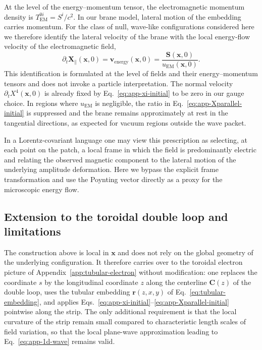 At the level of the energy--momentum tensor, the electromagnetic
momentum density is $T^{0i}_{\mathrm{EM}} = S^i/c^2$. In our brane
model, lateral motion of the embedding carries momentum. For the class
of null, wave-like configurations considered here we therefore identify
the lateral velocity of the brane with the local energy-flow velocity
of the electromagnetic field,
\begin{equation}
  \partial_t\mathbf X_\parallel(\mathbf x,0)
  = \mathbf v_{\mathrm{energy}}(\mathbf x,0)
  = \frac{\mathbf S(\mathbf x,0)}{u_{\mathrm{EM}}(\mathbf x,0)}.
  \label{eq:app-Xparallel-initial}
\end{equation}
This identification is formulated at the level of fields and their
energy--momentum tensors and does not invoke a particle interpretation.
The normal velocity $\partial_t X^4(\mathbf x,0)$ is already fixed by
Eq.~\eqref{eq:app-xi-initial} to be zero in our gauge choice. In regions
where $u_{\mathrm{EM}}$ is negligible, the ratio in
Eq.~\eqref{eq:app-Xparallel-initial} is suppressed and the brane remains
approximately at rest in the tangential directions, as expected for
vacuum regions outside the wave packet.

In a Lorentz-covariant language one may view this prescription as
selecting, at each point on the patch, a local frame in which the
field is predominantly electric and relating the observed magnetic
component to the lateral motion of the underlying amplitude deformation.
Here we bypass the explicit frame transformation and use the Poynting
vector directly as a proxy for the microscopic energy flow.

\subsection{Extension to the toroidal double loop and limitations}

The construction above is local in $\mathbf x$ and does not rely on the
global geometry of the underlying configuration. It therefore carries
over to the toroidal electron picture of
Appendix~\ref{app:tubular-electron} without modification: one replaces
the coordinate $s$ by the longitudinal coordinate $z$ along the
centerline $\mathbf C(z)$ of the double loop, uses the tubular embedding
$\mathbf r(z,x,y)$ of Eq.~\eqref{eq:tubular-embedding}, and applies
Eqs.~\eqref{eq:app-xi-initial}--\eqref{eq:app-Xparallel-initial}
pointwise along the strip. The only additional requirement is that the
local curvature of the strip remain small compared to characteristic
length scales of field variation, so that the local plane-wave
approximation leading to Eq.~\eqref{eq:app-1d-wave} remains valid.


